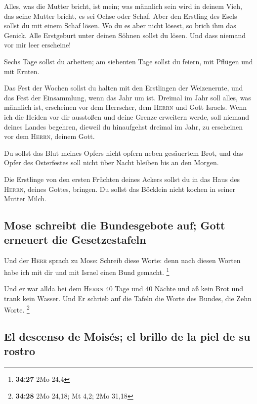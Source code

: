  Alles, was die Mutter bricht, ist mein; was männlich
sein wird in deinem Vieh, das seine Mutter bricht, es sei Ochse oder
Schaf.  Aber den Erstling des Esels sollst du mit einem
Schaf lösen. Wo du es aber nicht lösest, so brich ihm das Genick. Alle
Erstgeburt unter deinen Söhnen sollst du lösen. Und dass niemand vor mir
leer erscheine!

 Sechs Tage sollst du arbeiten; am siebenten Tage sollst
du feiern, mit Pflügen und mit Ernten.

 Das Fest der Wochen sollst du halten mit den Erstlingen
der Weizenernte, und das Fest der Einsammlung, wenn das Jahr um ist.
 Dreimal im Jahr soll alles, was männlich ist, erscheinen
vor dem Herrscher, dem \textsc{Herrn} und Gott Israels. 
Wenn ich die Heiden vor dir ausstoßen und deine Grenze erweitern werde,
soll niemand deines Landes begehren, dieweil du hinaufgehst dreimal im
Jahr, zu erscheinen vor dem \textsc{Herrn}, deinem Gott.

 Du sollst das Blut meines Opfers nicht opfern neben
gesäuertem Brot, und das Opfer des Osterfestes soll nicht über Nacht
bleiben bis an den Morgen.

 Die Erstlinge von den ersten Früchten deines Ackers
sollst du in das Haus des \textsc{Herrn}, deines Gottes, bringen. Du
sollst das Böcklein nicht kochen in seiner Mutter Milch.

\hypertarget{mose-schreibt-die-bundesgebote-auf-gott-erneuert-die-gesetzestafeln}{%
\subsection{Mose schreibt die Bundesgebote auf; Gott erneuert die
Gesetzestafeln}\label{mose-schreibt-die-bundesgebote-auf-gott-erneuert-die-gesetzestafeln}}

 Und der \textsc{Herr} sprach zu Mose: Schreib diese
Worte: denn nach diesen Worten habe ich mit dir und mit Israel einen
Bund gemacht. \footnote{\textbf{34:27} 2Mo 24,4}

 Und er war allda bei dem \textsc{Herrn} 40 Tage und 40
Nächte und aß kein Brot und trank kein Wasser. Und Er schrieb auf die
Tafeln die Worte des Bundes, die Zehn Worte. \footnote{\textbf{34:28}
  2Mo 24,18; Mt 4,2; 2Mo 31,18}

\hypertarget{el-descenso-de-moisuxe9s-el-brillo-de-la-piel-de-su-rostro}{%
\subsection{El descenso de Moisés; el brillo de la piel de su
rostro}\label{el-descenso-de-moisuxe9s-el-brillo-de-la-piel-de-su-rostro}}


